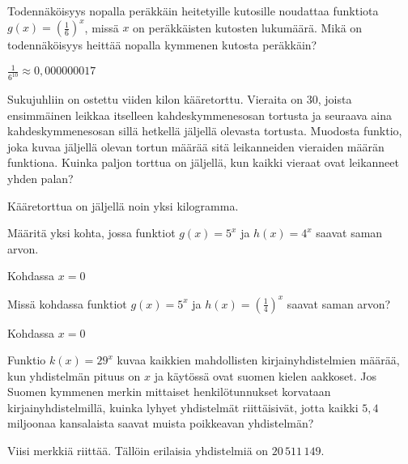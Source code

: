 \begin{tehtavasivu}
\begin{tehtava}
Todennäköisyys nopalla peräkkäin heitetyille kutosille noudattaa funktiota $g(x)=(\frac{1}{6})^{x} $, missä $x$ on peräkkäisten kutosten lukumäärä. Mikä on todennäköisyys heittää nopalla kymmenen kutosta peräkkäin?
\begin{vastaus}
$ \frac{1}{6^{10}}\approx0,000000017$
\end{vastaus}
\end{tehtava}

\begin{tehtava}
Sukujuhliin on ostettu viiden kilon kääretorttu. Vieraita on 30, joista ensimmäinen leikkaa itselleen kahdeskymmenesosan tortusta ja seuraava aina kahdeskymmenesosan sillä hetkellä jäljellä olevasta tortusta. Muodosta funktio, joka kuvaa jäljellä olevan tortun määrää sitä leikanneiden vieraiden määrän funktiona. Kuinka paljon torttua on jäljellä, kun kaikki vieraat ovat leikanneet yhden palan?
\begin{vastaus}
Kääretorttua on jäljellä noin yksi kilogramma.
\end{vastaus}
\end{tehtava}

\begin{tehtava} %
Määritä yksi kohta, jossa funktiot $g(x)=5^{x} $ ja $ h(x)=4^{x} $ saavat saman arvon.
\begin{vastaus}
Kohdassa $x=0$
\end{vastaus}
\end{tehtava}

\begin{tehtava}
Missä kohdassa funktiot $ g(x)=5^{x} $ ja $ h(x)=(\frac{1}{4})^{x} $ saavat saman arvon?
\begin{vastaus}
Kohdassa $x=0$
\end{vastaus}
\end{tehtava}


\begin{tehtava}
Funktio $ k(x)=29^x$ kuvaa kaikkien mahdollisten kirjainyhdistelmien määrää, kun yhdistelmän pituus on $x$ ja käytössä ovat suomen kielen aakkoset. Jos Suomen kymmenen merkin mittaiset henkilötunnukset korvataan kirjainyhdistelmillä, kuinka lyhyet yhdistelmät riittäisivät, jotta kaikki $5,4$ miljoonaa kansalaista saavat muista poikkeavan yhdistelmän?
\begin{vastaus}
Viisi merkkiä riittää. Tällöin erilaisia yhdistelmiä on $20\,511\,149$.
\end{vastaus}
\end{tehtava}


\end{tehtavasivu}
